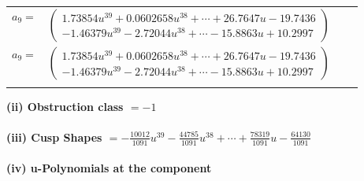 \documentclass[1p]{elsarticle_modified}
\theoremstyle{definition}
\begin{document}
\begin{tabular}{m{7pt} m{180pt} m{7pt} m{180pt} }
\flushright $a_{9}=$&$\begin{pmatrix}1.73854 u^{39}+0.0602658 u^{38}+\cdots+26.7647 u-19.7436\\-1.46379 u^{39}-2.72044 u^{38}+\cdots-15.8863 u+10.2997\end{pmatrix}$\\ \flushright $a_{9}=$&$\begin{pmatrix}1.73854 u^{39}+0.0602658 u^{38}+\cdots+26.7647 u-19.7436\\-1.46379 u^{39}-2.72044 u^{38}+\cdots-15.8863 u+10.2997\end{pmatrix}$\\&\end{tabular}
\flushleft \textbf{(ii) Obstruction class $= -1$}\\~\\
\flushleft \textbf{(iii) Cusp Shapes $= -\frac{10012}{1091} u^{39}-\frac{44785}{1091} u^{38}+\cdots+\frac{78319}{1091} u-\frac{64130}{1091}$}\\~\\
\newpage\renewcommand{\arraystretch}{1}
\flushleft \textbf{(iv) u-Polynomials at the component}\newline \\
\end{document}

